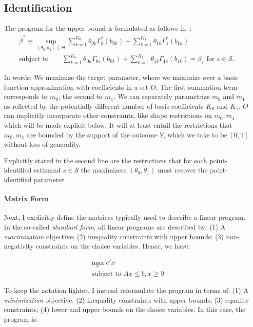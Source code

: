 \documentclass[12pt,a4paper,english]{article} %
\numberwithin{equation}{section}
\theoremstyle{definition}
\theoremstyle{remark}
\theoremstyle{plain}
\begin{document}
\subsection{Identification}

The program for the upper bound is formulated as follows in~\cite{mogstad2018using}:
\begin{align}
  \overline{\beta}^* \equiv \sup_{(\theta_0, \theta_1)\in\Theta} \sum_{k=1}^{K_0}\theta_{0k}\Gamma^*_0(b_{0k}) + \sum_{k=1}^{K_1}\theta_{1k}\Gamma^*_1(b_{1k}) \\
  \text{subject to} \qquad \sum_{k=1}^{K_0}\theta_{0k}\Gamma_{0s}(b_{0k}) + \sum_{k=1}^{K_1}\theta_{1k}\Gamma_{1s}(b_{1k}) = \beta_s \text{ for } s \in \mathcal{S}.
\end{align}

In words: We maximize the target parameter, where we maximize over a basis function approximation with coefficients in a set $\Theta$.
The first summation term corresponds to $m_0$, the second to $m_1$.
We can separately parametrize $m_0$ and $m_1$ as reflected by the potentially different number of basis coefficients $K_0$ and $K_1$.
$\Theta$ can implicitly incorporate other constraints, like shape restrictions on $m_0, m_1$ which will be made explicit below.
It will at least entail the restrictions that $m_0, m_1$ are bounded by the support of the outcome $Y$, which we take to be $[0,1]$ without loss of generality.

Explicitly stated in the second line are the restrictions that for each point-identified estimand $s\in\mathcal{S}$ the maximizers $(\theta_0, \theta_1)$ must recover the point-identified parameter.

\paragraph{Matrix Form}
Next, I explicitly define the matrices typically used to describe a linear program.
In the so-called \textit{standard form}, all linear programs are described by:
(1) A \textit{maximization} objective; (2) inequality constraints with upper bounds; (3) non-negativity constraints on the choice variables.
Hence, we have:

\begin{align}
  \max_x c'x \\
  \text{ subject to } Ax\leq b, x\geq0
\end{align}

To keep the notation lighter, I instead reformulate the program in terms of:
(1) A \textit{minimization} objective; (2) inequality constraints with upper bounds; (3) equality constraints; (4) lower and upper bounds on the choice variables.
In this case, the program is:
\end{document}
